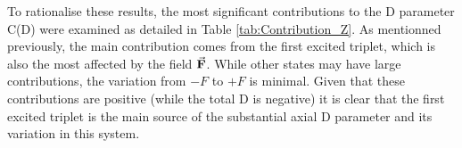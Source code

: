 \documentclass[12pt]{report}
\numberwithin{equation}{section}
\begin{document}
\begin{table}[!ht]
    \centering
	\caption{Slopes of the straight lines in cases (a), (b) and (c) for the D and E parameter for $\vec{\vb{F}}\parallel Z$, Fig. \ref{fig:Ni_D_Z} and \ref{fig:Ni_E_Z}}
    \label{tab:Slope_D_Z}
\end{table}

To rationalise these results, the most significant contributions to the D parameter C(D) were examined as detailed in Table \ref{tab:Contribution_Z}.
As mentionned previously, the main contribution comes from the first excited triplet, which is also the most affected by the field $\vec{\vb F}$.
While other states may have large contributions, the variation from $-F$ to $+F$ is minimal. 
Given that these contributions are positive (while the total D is negative) it is clear that the first excited triplet is the main source of the substantial axial D parameter and its variation in this system.
\end{document}
